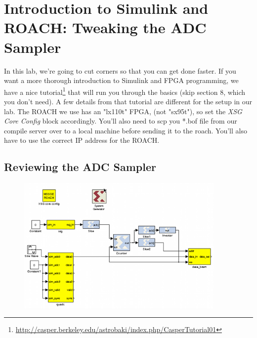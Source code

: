 \documentclass[11pt]{article}
\begin{document}
\section{Introduction to Simulink and ROACH: Tweaking the ADC Sampler}

In this lab, we're going to cut corners so that you can get done faster. 
If you want a more thorough introduction to Simulink and FPGA programming, we have a nice
tutorial\footnote{\url{http://casper.berkeley.edu/astrobaki/index.php/CasperTutorial01}}
that will run you through the basics (skip section 8, which you don't need).
A few details from that tutorial are different for the setup in our lab. 
The ROACH we use has an "lx110t" FPGA, (not "sx95t"), so set the {\it XSG Core Config} block accordingly.
You'll also need to scp you *.bof file from our compile server over to a local machine before
sending it to the roach.  You'll also have to use the correct IP address for the ROACH.

\subsection{Reviewing the ADC Sampler}

\begin{figure}\centering
\includegraphics[width=4in]{digital_lab_2_plots/adc_capture.png}
\end{figure}
\end{document}
